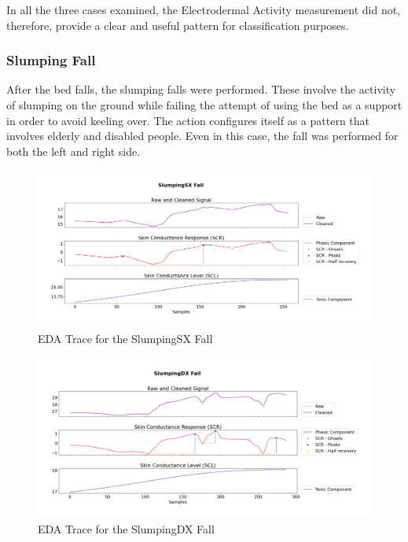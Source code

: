 In all the three cases examined, the Electrodermal Activity measurement did not, therefore, provide a clear and useful pattern for classification purposes.

\subsubsection{Slumping Fall}\label{subsubsec:slumping-fall}

After the bed falls, the slumping falls were performed. These involve the activity of slumping on the ground while failing the attempt of using the bed as a support in order to avoid keeling over. The action configures itself as a pattern that involves elderly and disabled people. Even in this case, the fall was performed for both the left and right side.

\begin{figure}[h!]
    \centering
    \includegraphics[width=\textwidth]{./images/movisens/SlumpingSX.png}
    \caption{EDA Trace for the SlumpingSX Fall}
    \label{fig:movisens-slumpsx}
\end{figure}

\begin{figure}[h!]
    \centering
    \includegraphics[width=\textwidth]{./images/movisens/SlumpingDX.png}
    \caption{EDA Trace for the SlumpingDX Fall}
    \label{fig:movisens-slumpdx}
\end{figure}

